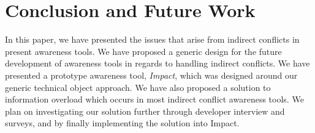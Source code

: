 \documentclass[conference]{IEEEtran}
\begin{document}
\section{Conclusion and Future Work}
In this paper, we have presented the issues that arise from indirect 
conflicts in present awareness tools. We have proposed a generic 
design for the future development of awareness tools in regards to
handling indirect conflicts. We have presented a prototype 
awareness tool, \textit{Impact}, which was designed around our generic 
technical object approach. We have also proposed a solution to information
overload which occurs in most indirect conflict awareness tools. We plan
on investigating our solution further through developer interview and
surveys, and by finally implementing the solution into Impact.





\end{document}
